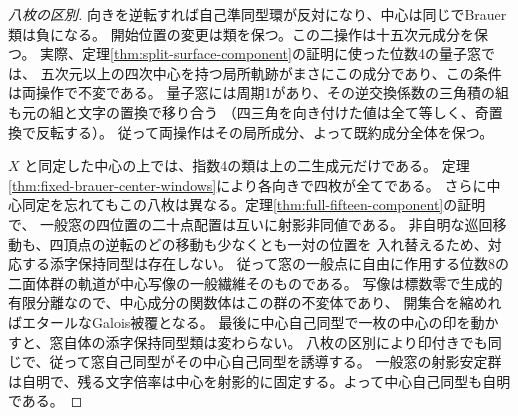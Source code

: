 \begin{proof}[八枚の区別]
向きを逆転すれば自己準同型環が反対になり、中心は同じでBrauer類は負になる。
開始位置の変更は類を保つ。この二操作は十五次元成分を保つ。
実際、定理\ref{thm:split-surface-component}の証明に使った位数4の量子窓では、
五次元以上の四次中心を持つ局所軌跡がまさにこの成分であり、この条件は両操作で不変である。
量子窓には周期1があり、その逆交換係数の三角積の組も元の組と文字の置換で移り合う
（四三角を向き付けた値は全て等しく、奇置換で反転する）。
従って両操作はその局所成分、よって既約成分全体を保つ。

$X$ と同定した中心の上では、指数4の類は上の二生成元だけである。
定理\ref{thm:fixed-brauer-center-windows}により各向きで四枚が全てである。
さらに中心同定を忘れてもこの八枚は異なる。定理\ref{thm:full-fifteen-component}の証明で、
一般窓の四位置の二十点配置は互いに射影非同値である。
非自明な巡回移動も、四頂点の逆転のどの移動も少なくとも一対の位置を
入れ替えるため、対応する添字保持同型は存在しない。
従って窓の一般点に自由に作用する位数8の二面体群の軌道が中心写像の一般繊維そのものである。
写像は標数零で生成的有限分離なので、中心成分の関数体はこの群の不変体であり、
開集合を縮めればエタールなGalois被覆となる。
最後に中心自己同型で一枚の中心の印を動かすと、窓自体の添字保持同型類は変わらない。
八枚の区別により印付きでも同じで、従って窓自己同型がその中心自己同型を誘導する。
一般窓の射影安定群は自明で、残る文字倍率は中心を射影的に固定する。よって中心自己同型も自明である。
\end{proof}
